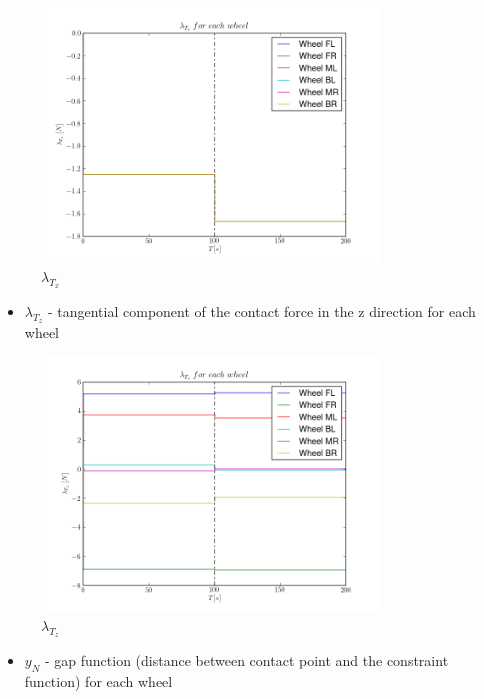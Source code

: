 \begin{figure}[H]
  \centering
    \includegraphics[width=0.8\textwidth]{lambdaTx4}
  \caption{$\lambda_{T_x}$}
\end{figure}

\begin{itemize}
  \item $\lambda_{T_z}$ - tangential component of the contact force in the z direction for each wheel
\end{itemize}

\begin{figure}[H]
  \centering
    \includegraphics[width=0.8\textwidth]{lambdaTz4}
  \caption{$\lambda_{T_z}$}
\end{figure}

\begin{itemize}
  \item $y_{N}$ - gap function (distance between contact point and the constraint function) for each wheel
\end{itemize}

